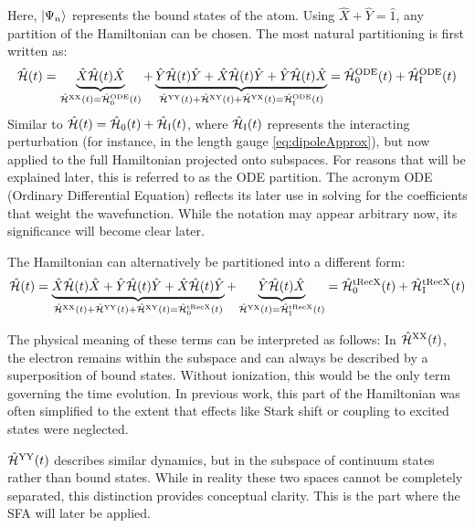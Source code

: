 Here, $\ket{\Psi_n}$ represents the bound states of the atom. Using $\hat{X}+\hat{Y}=\hat{1}$, any partition of the Hamiltonian can be chosen.
The most natural partitioning is first written as:
\begin{equation*}
    \hat{\mathcal{H}}(t) = \underbrace{\hat{X}\hat{\mathcal{H}}(t)\hat{X}}_{\hat{\mathcal{H}}^{\mathrm{XX}}(t)=\hat{\mathcal{H}}^{\mathrm{ODE}}_0(t)} + \underbrace{\hat{Y}\hat{\mathcal{H}}(t)\hat{Y} + \hat{X}\hat{\mathcal{H}}(t)\hat{Y} + \hat{Y}\hat{\mathcal{H}}(t)\hat{X}}_{\hat{\mathcal{H}}^{\mathrm{YY}}(t)+\hat{\mathcal{H}}^{\mathrm{XY}}(t)+\hat{\mathcal{H}}^{\mathrm{YX}}(t)=\hat{\mathcal{H}}^{\mathrm{ODE}}_{\mathrm{I}}(t)} = \hat{\mathcal{H}}^{\mathrm{ODE}}_0(t)+\hat{\mathcal{H}}^{\mathrm{ODE}}_{\mathrm{I}}(t)
\end{equation*}
Similar to $\hat{\mathcal{H}}(t)=\hat{\mathcal{H}}_0(t)+\hat{\mathcal{H}}_\mathrm{I}(t)$, where $\hat{\mathcal{H}}_\mathrm{I}(t)$ represents the interacting perturbation (for instance, in the length gauge \eqref{eq:dipoleApprox}), but now applied to the full Hamiltonian projected onto subspaces.
For reasons that will be explained later, this is referred to as the ODE partition.
The acronym ODE (Ordinary Differential Equation) reflects its later use in solving for the coefficients that weight the wavefunction.
While the notation may appear arbitrary now, its significance will become clear later.

The Hamiltonian can alternatively be partitioned into a different form:
\begin{equation*}
    \hat{\mathcal{H}}(t) = \underbrace{\hat{X}\hat{\mathcal{H}}(t)\hat{X} + \hat{Y}\hat{\mathcal{H}}(t)\hat{Y} + \hat{X}\hat{\mathcal{H}}(t)\hat{Y}}_{\hat{\mathcal{H}}^{\mathrm{XX}}(t)+\hat{\mathcal{H}}^{\mathrm{YY}}(t)+\hat{\mathcal{H}}^{\mathrm{XY}}(t)=\hat{\mathcal{H}}^{\mathrm{tRecX}}_0(t)} + \underbrace{\hat{Y}\hat{\mathcal{H}}(t)\hat{X}}_{\hat{\mathcal{H}}^{\mathrm{YX}}(t) = \hat{\mathcal{H}}^{\mathrm{tRecX}}_{\mathrm{I}}(t)} = \hat{\mathcal{H}}^{\mathrm{tRecX}}_0(t)+\hat{\mathcal{H}}^{\mathrm{tRecX}}_{\mathrm{I}}(t)
\end{equation*}

The physical meaning of these terms can be interpreted as follows:
In $\hat{\mathcal{H}}^{\mathrm{XX}}(t)$, the electron remains within the subspace and can always be described by a superposition of bound states.
Without ionization, this would be the only term governing the time evolution.
In previous work, this part of the Hamiltonian was often simplified to the extent that effects like Stark shift or coupling to excited states were neglected.

$\hat{\mathcal{H}}^{\mathrm{YY}}(t)$ describes similar dynamics, but in the subspace of continuum states rather than bound states.
While in reality these two spaces cannot be completely separated, this distinction provides conceptual clarity.
This is the part where the SFA will later be applied.

